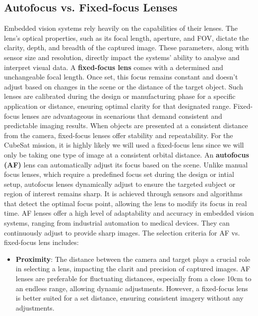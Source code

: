 \documentclass[10pt]{article}
\begin{document}
\begin{multicols}{2}
\subsection{Autofocus vs. Fixed-focus Lenses}
Embedded vision systems rely heavily on the capabilities of their lenses. The lens's optical properties, such as its focal length, aperture, and FOV, dictate the clarity, depth, and breadth of the captured image. These parameters, along with sensor size and resolution, directly impact the systems' ability to analyse and interpret visual data.
\newline \newline
A \textbf{fixed-focus lens} comes with a determined and unchangeable focal length. Once set, this focus remains constant and doesn't adjust based on changes in the scene or the distance of the target object. Such lenses are calibrated during the design or manufacturing phase for a specific application or distance, ensuring optimal clarity for that designated range.
Fixed-focus lenses are advantageous in scenarious that demand consistent and predictable imaging results. When objects are presented at a consistent distance from the camera, fixed-focus lenses offer stability and repeatability. For the CubeSat mission, it is highly likely we will used a fixed-focus lens since we will only be taking one type of image at a consistent orbital distance.
\newline \newline
An \textbf{autofocus (AF)} lens can automatically adjust its focus based on the scene. Unlike manual focus lenses, which require a predefined focus set during the design or intial setup, autofocus lenses dynamically adjust to ensure the targeted subject or region of interest remains sharp. It is achieved through sensors and algorithms that detect the optimal focus point, allowing the lens to modify its focus in real time.
AF lenses offer a high level of adaptability and accuracy in embedded vision systems, ranging from industrial automation to medical devices. They can continuously adjust to provide sharp images.
\newline \newline
The selection criteria for AF vs. fixed-focus lens includes:
\begin{itemize}
    \item \textbf{Proximity}: The distance between the camera and target plays a crucial role in selecting a lens, impacting the clarit and precision of captured images. AF lenses are preferable for fluctuating distances, especially from a close 10cm to an endless range, allowing dynamic adjustments. However, a fixed-focus lens is better suited for a set distance, ensuring consistent imagery without any adjustments.

\end{itemize}
\end{multicols}
\end{document}
